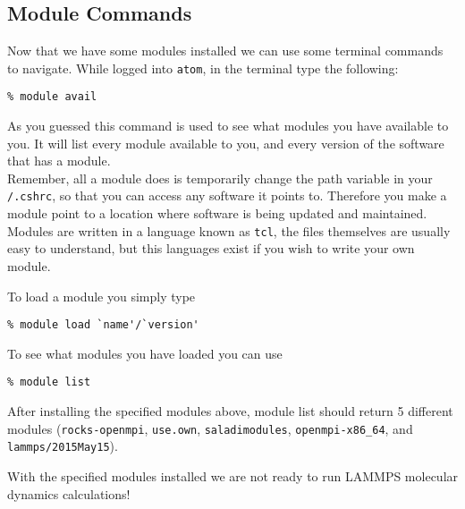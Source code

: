 \documentclass{article}
\begin{document}
\subsection*{Module Commands}
Now that we have some modules installed we can use some terminal commands to navigate.
While logged into \texttt{atom}, in the terminal type the following:

\begin{lstlisting}
% module avail
\end{lstlisting}

As you guessed this command is used to see what modules you have available to you.
It will list every module available to you, and every version of the software that has a module.\\

Remember, all a module does is temporarily change the path variable in your \texttt{/.cshrc}, so that you can access any software it points to.
Therefore you make a module point to a location where software is being updated and maintained.
Modules are written in a language known as \texttt{tcl}, the files themselves are usually easy to understand, but this languages exist if you wish to write your own module.

To load a module you simply type

\begin{lstlisting}
% module load `name'/`version'
\end{lstlisting}

To see what modules you have loaded you can use

\begin{lstlisting}
% module list
\end{lstlisting}

After installing the specified modules above, module list should return 5 different modules (\texttt{rocks-openmpi}, \texttt{use.own}, \texttt{saladimodules}, \texttt{openmpi-x86\_64}, and \texttt{lammps/2015May15}).

With the specified modules installed we are not ready to run LAMMPS molecular dynamics calculations!
\end{document}

